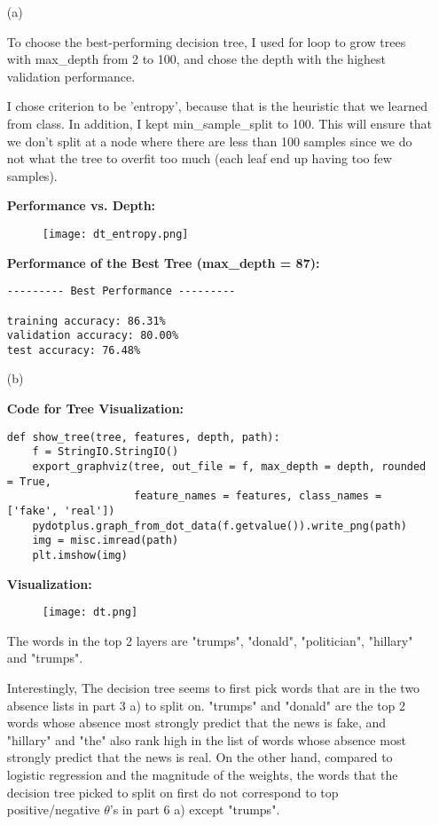 \documentclass{article}
\begin{document}
\begin{enumerate}
\item[(a)]

To choose the best-performing decision tree, I used for loop to grow trees with max\_depth from 2 to 100, and chose the depth with the highest validation performance.   

I chose criterion to be 'entropy', because that is the heuristic that we learned from class. In addition, I kept min\_sample\_split to 100. This will ensure that we don't split at a node where there are less than 100 samples since we do not what the tree to overfit too much (each leaf end up having too few samples).

\textbf{Performance vs. Depth:}
\begin{figure}[!ht]
    \centering
    \texttt{[image: dt\_entropy.png]}
\end{figure}


\textbf{Performance of the Best Tree (max\_depth = 87):}
\begin{verbatim}
--------- Best Performance ---------

training accuracy: 86.31%
validation accuracy: 80.00%
test accuracy: 76.48%
\end{verbatim}


\item[(b)]

\textbf{Code for Tree Visualization:}
\begin{verbatim}
def show_tree(tree, features, depth, path):
    f = StringIO.StringIO()
    export_graphviz(tree, out_file = f, max_depth = depth, rounded = True,
                    feature_names = features, class_names = ['fake', 'real'])
    pydotplus.graph_from_dot_data(f.getvalue()).write_png(path)
    img = misc.imread(path)
    plt.imshow(img)
\end{verbatim}

\textbf{Visualization:}
\begin{figure}[!ht]
    \centering
    \texttt{[image: dt.png]}
\end{figure}

The words in the top 2 layers are "trumps", "donald", "politician", "hillary" and "trumps".

Interestingly, The decision tree seems to first pick words that are in the two absence lists in part 3 a) to split on. "trumps" and "donald" are the top 2 words whose absence most strongly predict that the news is fake, and "hillary" and 
"the" also rank high in the list of words whose absence most strongly predict that the news is real. On the other hand, compared to logistic regression and the magnitude of the weights, the words that the decision tree picked to split on first do not correspond to top positive/negative $\theta$'s in part 6 a) except "trumps".



\end{enumerate}
\end{document}
